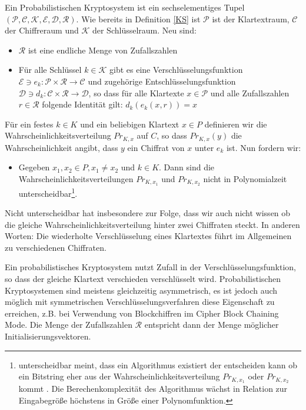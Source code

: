 \begin{theorem}
	\label{PKS}
	Ein Probabilistischen Kryptosystem ist ein sechselementiges Tupel $(\mathcal{P},\mathcal{C},\mathcal{K},\mathcal{E},\mathcal{D},\mathcal{R})$. Wie bereits in Definition \ref{KS} ist $\mathcal{P}$ ist der Klartextraum, $\mathcal{C}$ der Chiffreraum und $\mathcal{K}$ der Schlüsselraum. Neu sind:
	\begin{itemize}
		\item $\mathcal{R}$ ist eine endliche Menge von Zufallszahlen
		\item Für alle Schlüssel $k\in \mathcal{K}$ gibt es eine Verschlüsselungsfunktion $\mathcal{E}\ni e_k:\mathcal{P}\times\mathcal{R}\rightarrow\mathcal{C}$ und zugehörige Entschlüsselungsfunktion $\mathcal{D}\ni d_k:\mathcal{C}\times\mathcal{R}\rightarrow\mathcal{D}$, so dass für alle Klartexte $x\in\mathcal{P}$ und alle Zufallszahlen $r\in\mathcal{R}$ folgende Identität gilt: $d_k(e_k(x,r)) = x$ 
	\end{itemize}
	Für ein festes $k\in K$ und ein beliebigen Klartext $x\in P$ definieren wir die Wahrscheinlichkeitsverteilung $Pr_{K,x}$ auf $C$, so dass  $Pr_{K,x}(y)$ die Wahrscheinlichkeit angibt, dass $y$ ein Chiffrat von $x$ unter $e_k$ ist. Nun fordern wir:
	
	\begin{itemize}
			\item Gegeben $x_1,x_2\in P, x_1\neq x_2$ und $k\in K$. Dann sind die Wahrscheinlichkeitsverteilungen $Pr_{K,x_1}$ und  $Pr_{K,x_2}$ nicht in Polynomialzeit unterscheidbar\footnote{unterscheidbar meint, dass ein Algorithmus existiert der entscheiden kann ob ein Bitstring eher aus der Wahrscheinlichkeitsverteilung $Pr_{K,x_1}$ oder  $Pr_{K,x_2}$ kommt \cite[p.329]{stinson2006cryptography}. Die Berechenkomplexität des Algorithmus wächst in Relation zur Eingabegröße höchstens in Größe einer Polynomfunktion. }.
	\end{itemize}
\end{theorem}

Nicht unterscheidbar hat insbesondere zur Folge, dass wir auch nicht wissen ob die gleiche Wahrscheinlichkeitsverteilung hinter zwei Chiffraten steckt. In anderen Worten: Die wiederholte Verschlüsselung eines Klartextes führt im Allgemeinen zu verschiedenen Chiffraten.

Ein probabilistisches Kryptosystem nutzt Zufall in der Verschlüsselungsfunktion, so dass der gleiche Klartext verschieden verschlüsselt wird. Probabilistischen Kryptosystemen sind meistens gleichzeitig asymmetrisch, es ist jedoch auch möglich mit symmetrischen Verschlüsselungsverfahren diese Eigenschaft zu erreichen, z.B. bei Verwendung von Blockchiffren im Cipher Block Chaining Mode. Die Menge der Zufallszahlen $\mathcal{R}$ entspricht dann der Menge möglicher Initialisierungsvektoren. 

